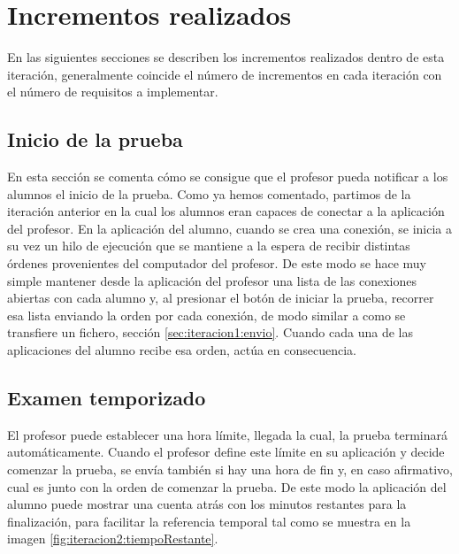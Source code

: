 \section{Incrementos realizados}

En las siguientes secciones se describen los incrementos realizados dentro de esta iteración, generalmente coincide el número de incrementos en cada iteración con el número de requisitos a implementar.

\subsection{Inicio de la prueba}
\label{sec:iteracion2:iniPrueba}

En esta sección se comenta cómo se consigue que el profesor pueda notificar a los alumnos el inicio de la prueba.
Como ya hemos comentado, partimos de la iteración anterior en la cual los alumnos eran capaces de conectar a la aplicación del profesor. En la aplicación del alumno, cuando se crea una conexión, se inicia a su vez un hilo de ejecución que se mantiene a la espera de recibir distintas órdenes provenientes del computador del profesor. De este modo se hace muy simple mantener desde la aplicación del profesor una lista de las conexiones abiertas con cada alumno y, al presionar el botón de iniciar la prueba, recorrer esa lista enviando la orden por cada conexión, de modo similar a como se transfiere un fichero, sección \ref{sec:iteracion1:envio}. Cuando cada una de las aplicaciones del alumno recibe esa orden, actúa en consecuencia.

\subsection{Examen temporizado}
\label{sec:iteracion2:examenTemporizado}

El profesor puede establecer una hora límite, llegada la cual, la prueba terminará automáticamente. Cuando el profesor define este límite en su aplicación y decide comenzar la prueba, se envía también si hay una hora de fin y, en caso afirmativo, cual es junto con la orden de comenzar la prueba. De este modo la aplicación del alumno puede mostrar una cuenta atrás con los minutos restantes para la finalización, para facilitar la referencia temporal tal como se muestra en la imagen \ref{fig:iteracion2:tiempoRestante}.

